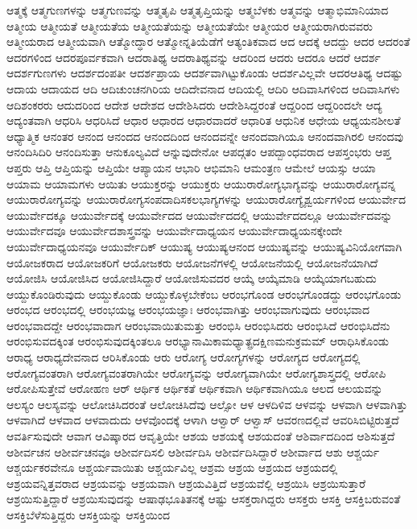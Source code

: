 {ಆತ್ಮಕ್ಕೆ
ಆತ್ಮಗುಣಗಳನ್ನು
ಆತ್ಮಗುಣವನ್ನು
ಆತ್ಮತೃಪಿ
ಆತ್ಮತೃಪ್ತಿಯನ್ನು
ಆತ್ಮಬೆಳಕು
ಆತ್ಮವನ್ನು
ಆತ್ಮಾಭಿಮಾನಿಯಾದ
ಆತ್ಮೀಯ
ಆತ್ಮೀಯತೆ
ಆತ್ಮೀಯತೆಯ
ಆತ್ಮೀಯತೆಯನ್ನು
ಆತ್ಮೀಯತೆಯೇ
ಆತ್ಮೀಯರ
ಆತ್ಮೀಯರಾಗಿರುವವರು
ಆತ್ಮೀಯರಾದ
ಆತ್ಮೀಯವಾಗಿ
ಆತ್ಮೋದ್ಧಾರ
ಆತ್ಮೋನ್ನತಿಯೆಡೆಗೆ
ಆತ್ಯಂತಿಕವಾದ
ಆದ
ಆದಕ್ಕೆ
ಆದದ್ದು
ಆದರ
ಆದರಂತೆ
ಆದರಗಳಿಂದ
ಆದರಪೂರ್ವಕವಾಗಿ
ಆದರಾತಿಥ್ಯ
ಆದರಾತಿಥ್ಯವನ್ನು
ಆದರಿಂದ
ಆದರು
ಆದರೂ
ಆದರೆ
ಆದರ್ಶ
ಆದರ್ಶಗುಣಗಳು
ಆದರ್ಶದಂಪತೀ
ಆದರ್ಶಪ್ರಾಯ
ಆದರ್ಶವಾಗಿಟ್ಟುಕೊಂಡು
ಆದರ್ಶವಿಲ್ಲವೇ
ಆದರಆತಿಥ್ಯ
ಆದಷ್ಟು
ಆದಾಯ
ಆದಾಯದ
ಆದಿ
ಆದಿಚುಂಚನಗಿರಿಯ
ಆದಿದೇವನಾದ
ಆದಿಯಲ್ಲಿ
ಆದಿರಿ
ಆದಿವಾಸಿಗಳಿಂದ
ಆದಿವಾಸಿಗಳು
ಆದಿಶಂಕರರು
ಆದುದರಿಂದ
ಆದೇಶ
ಆದೇಶದ
ಆದೇಶಿಸಿದರು
ಆದೇಶಿಸಿದ್ದರಂತೆ
ಆದ್ದರಿಂದ
ಆದ್ದರಿಂದಲೇ
ಆದ್ಯ
ಆದ್ಯಂತವಾಗಿ
ಆಧರಿಸಿ
ಆಧರಿಸಿದೆ
ಆಧಾರ
ಆಧಾರದ
ಆಧಾರವಾದರೆ
ಆಧಾರಿತ
ಆಧುನಿಕ
ಆಧೇಯ
ಆಧ್ಯಯನಶೀಲತೆ
ಆಧ್ಯಾತ್ಮಿಕ
ಆನಂತರ
ಆನಂದ
ಆನಂದದ
ಆನಂದದಿಂದ
ಆನಂದವನ್ನೇ
ಆನಂದವಾಗಿಯೂ
ಆನಂದವಾಗಿರಲಿ
ಆನಂದವು
ಆನಂದಿಸಿದಿರಿ
ಆನಂದಿಸುತ್ತಾ
ಆನುಕೂಲ್ಯವಿದೆ
ಆನ್ನುವುದೇನೋ
ಆಪದ್ಗತಂ
ಆಪದ್ಬಾಂಧವರಾದ
ಆಪಸ್ತಂಭರು
ಆಪ್ತ
ಆಪ್ತರು
ಆಪ್ತಿ
ಆಪ್ತಿಯನ್ನು
ಆಪ್ತಿಯೇ
ಆಪ್ಯಾಯನ
ಆಭಾರಿ
ಆಭಿಮಾನಿ
ಆಮಂತ್ರಣ
ಆಮೇಲೆ
ಆಯಸ್ಸು
ಆಯಾ
ಆಯಾಮ
ಆಯಾಮಗಳು
ಆಯಿತು
ಆಯುಕ್ತರನ್ನು
ಆಯುಕ್ತರು
ಆಯುರಾರೋಗ್ಯಭಾಗ್ಯವನ್ನು
ಆಯುರಾರೋಗ್ಯವನ್ನ
ಆಯುರಾರೋಗ್ಯವನ್ನು
ಆಯುರಾರೋಗ್ಯಸಂಪದಾದಿಸಕಲಭಾಗ್ಯಗಳನ್ನು
ಆಯುರಾರೋಗ್ಯೈಶ್ವರ್ಯಗಳಿಂದ
ಆಯುರ್ವೇದ
ಆಯುರ್ವೇದಕ್ಕೂ
ಆಯುರ್ವೇದಕ್ಕೆ
ಆಯುರ್ವೇದದ
ಆಯುರ್ವೇದದಲ್ಲಿ
ಆಯುರ್ವೇದದಲ್ಲೂ
ಆಯುರ್ವೇದವನ್ನು
ಆಯುರ್ವೇದವೂ
ಆಯುರ್ವೇದಶಾಸ್ತ್ರವನ್ನು
ಆಯುರ್ವೇದಾಧ್ಯಯನ
ಆಯುರ್ವೇದಾಧ್ಯಯನಕ್ಕೇಂದೇ
ಆಯುರ್ವೇದಾಧ್ಯಯನವೂ
ಆಯುರ್ವೇದಿಕ್
ಆಯುಷ್ಯ
ಆಯುಷ್ಯಆನಂದ
ಆಯುಷ್ಯವನ್ನು
ಆಯುಷ್ಯವಿನಿಯೋಗವಾಗಿ
ಆಯೋಜಕರಾದ
ಆಯೋಜಕರಿಗೆ
ಆಯೋಜಕರು
ಆಯೋಜನೆಗಳಲ್ಲಿ
ಆಯೋಜನೆಯಲ್ಲಿ
ಆಯೋಜನೆಯಾಗಿದೆ
ಆಯೋಜಿಸಿ
ಆಯೋಜಿಸಿದ
ಆಯೋಜಿಸಿದ್ದಾರೆ
ಆಯೋಜಿಸುವದರ
ಆಯ್ಕೆ
ಆಯ್ಕೆಮಾಡಿ
ಆಯ್ಕೆಯಾಗಬಹುದು
ಆಯ್ದುಕೊಂಡಿರುವುದು
ಆಯ್ದುಕೊಂಡು
ಆಯ್ದುಕೊಳ್ಳಬೇಕೆಂಬ
ಆರಂಭಗೊಂಡ
ಆರಂಭಗೊಂಡದ್ದು
ಆರಂಭಗೊಂಡು
ಆರಂಭದ
ಆರಂಭದಲ್ಲಿ
ಆರಂಭಯಜ್ಞ
ಆರಂಭಯಜ್ಞಾಃ
ಆರಂಭವಾಗಿತ್ತು
ಆರಂಭವಾಗುವುದು
ಆರಂಭವಾದ
ಆರಂಭವಾದದ್ದೇ
ಆರಂಭವಾದಾಗ
ಆರಂಭವಾಯಿತುಮತ್ತು
ಆರಂಭಿಸಿ
ಆರಂಭಿಸಿದರು
ಆರಂಭಿಸಿದೆ
ಆರಂಭಿಸಿದೆನು
ಆರಂಭಿಸುವದಕ್ಕಿಂತ
ಆರಂಭಿಸುವುದಕ್ಕಿಂತಲೂ
ಆರಭ್ಯಾನಾಮಿಕಾಮಧ್ಯಾತ್ಪ್ರದಕ್ಷಿಣಮನುಕ್ರಮಮ್
ಆರಾಧಿಸಿಕೊಂಡು
ಆರಾಧ್ಯ
ಆರಾಧ್ಯದೇವನಾದ
ಆರಿಸಿಕೊಂಡು
ಆರು
ಆರೋಗ್ಯ
ಆರೋಗ್ಯಗಳನ್ನು
ಆರೋಗ್ಯದ
ಆರೋಗ್ಯದಲ್ಲಿ
ಆರೋಗ್ಯವಂತರಾಗಿ
ಆರೋಗ್ಯವಂತರಾಗಿಯೇ
ಆರೋಗ್ಯವನ್ನು
ಆರೋಗ್ಯವಾಗಿಯೇ
ಆರೋಗ್ಯಶಾಸ್ತ್ರದಲ್ಲಿ
ಆರೋಪಿ
ಆರೋಪಿಸುತ್ತೇವೆ
ಆರೋಹಣ
ಆರ್
ಆರ್ಥಿಕ
ಆರ್ಥಿಕತೆ
ಆರ್ಥಿಕವಾಗಿ
ಆರ್ಥಿಕವಾಗಿಯೂ
ಆಲದ
ಆಲಯವನ್ನು
ಆಲಸ್ಯಂ
ಆಲಸ್ಯವನ್ನು
ಆಲೋಚಿಸಿದರಂತೆ
ಆಲೋಚಿಸಿದೆವು
ಆಲ್ಸೋ
ಆಳ
ಆಳದಿಳಿವ
ಆಳವನ್ನು
ಆಳವಾಗಿ
ಆಳವಾಗಿತ್ತು
ಆಳವಾಗಿದೆ
ಆಳವಾದ
ಆಳವಾದುದು
ಆಳವೊಂದಕ್ಕೆ
ಆಳಾಗಿ
ಆಳ್ವಾರ್
ಆಳ್ವಾಸ್
ಆವರಣದಲ್ಲಿವೆ
ಆವರಿಸಿಬಿಟ್ಟಿರುತ್ತದೆ
ಆವರ್ತಿಸುವುದೇ
ಆವಾಗ
ಆವಿಷ್ಕಾರದ
ಆವೃತ್ತಿಯೇ
ಆಶಯ
ಆಶಯಕ್ಕೆ
ಆಶಯದಂತೆ
ಆಶಿರ್ವಾದದಿಂದ
ಆಶಿಸುತ್ತದೆ
ಆಶೀರ್ವಚನ
ಆಶೀರ್ವಚನವೂ
ಆಶೀರ್ವದಿಸಲಿ
ಆಶೀರ್ವದಿಸಿ
ಆಶೀರ್ವದಿಸಿದ್ದಾರೆ
ಆಶೀರ್ವಾದ
ಆಶು
ಆಶ್ಚರ್ಯ
ಆಶ್ಚರ್ಯಕರವೇನೂ
ಆಶ್ಚರ್ಯವಾಯಿತು
ಆಶ್ಚರ್ಯವಿಲ್ಲ
ಆಶ್ರಮ
ಆಶ್ರಯ
ಆಶ್ರಯದ
ಆಶ್ರಯದಲ್ಲಿ
ಆಶ್ರಯವನ್ನಿತ್ತವರಾದ
ಆಶ್ರಯವನ್ನು
ಆಶ್ರಯವಾಗಿ
ಆಶ್ರಯವಿತ್ತಿದೆ
ಆಶ್ರಯವೆಲ್ಲಿ
ಆಶ್ರಯಿಸಿ
ಆಶ್ರಯಿಸುತ್ತಾರೆ
ಆಶ್ರಯಿಸುತ್ತಿದ್ದಾರೆ
ಆಶ್ರಯಿಸುವುದನ್ನು
ಆಷಾಢಭೂತಿತನಕ್ಕೆ
ಆಷ್ಟು
ಆಸಕ್ತರಾಗಿದ್ದರು
ಆಸಕ್ತರು
ಆಸಕ್ತಿ
ಆಸಕ್ತಿಬರುವಂತೆ
ಆಸಕ್ತಿಬೆಳೆಸುತ್ತಿದ್ದರು
ಆಸಕ್ತಿಯನ್ನು
ಆಸಕ್ತಿಯಿಂದ
}
